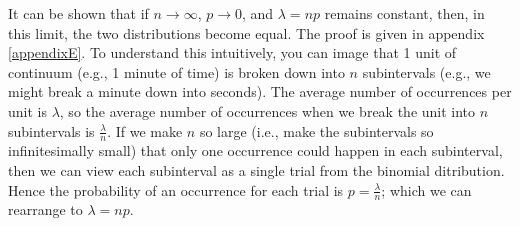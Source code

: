 \noindent It can be shown that if $n \rightarrow \infty$, $p \rightarrow 0$, and $\lambda = np$ remains constant, then, in this limit, the two distributions become equal. The proof is given in appendix \ref{appendixE}. To understand this intuitively, you can image that 1 unit of continuum (e.g., 1 minute of time) is broken down into $n$ subintervals (e.g., we might break a minute down into seconds). The average number of occurrences per unit is $\lambda$, so the average number of occurrences when we break the unit into $n$ subintervals is $\frac{\lambda}{n}.$ If we make $n$ so large (i.e., make the subintervals so infinitesimally small) that only one occurrence could happen in each subinterval, then we can view each subinterval as a single trial from the binomial ditribution. Hence the probability of an occurrence for each trial is $p = \frac{\lambda}{n}$; which we can rearrange to $\lambda = np.$


%
%

